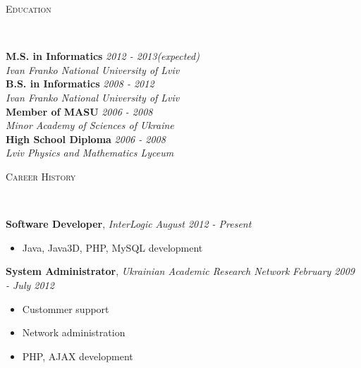 \documentclass{article}
\newenvironment{changemargin}[2]{%
  \begin{list}{}{%
    \setlength{\topsep}{0pt}%
    \setlength{\leftmargin}{#1}%
    \setlength{\rightmargin}{#2}%
    \setlength{\listparindent}{\parindent}%
    \setlength{\itemindent}{\parindent}%
    \setlength{\parsep}{\parskip}%
  }%
  \item[]}{\end{list}
}
\newcommand{\lineover}{
  \begin{changemargin}{-1mm}{-1mm}
    \vspace*{-8pt}
    \hrulefill \\
    \vspace*{-2pt}
  \end{changemargin}
}
\newcommand{\header}[1]{
  \begin{changemargin}{-12mm}{-12mm}
    \scshape{#1}\\
    \lineover
  \end{changemargin}
}
\newenvironment{body}{
  \vspace*{-16pt}
  \begin{changemargin}{-6mm}{-12mm}
}{
  \end{changemargin}
}
\begin{document}



\header{Education}

\begin{body}
  \vspace{14pt}
  \textbf{M.S. in Informatics} \hfill \emph{2012 - 2013(expected)} \\
  \emph{Ivan Franko National University of Lviv} \\
  \medskip
  \textbf{B.S. in Informatics} \hfill \emph{2008 - 2012} \\
  \emph{Ivan Franko National University of Lviv} \\
  \medskip
  \textbf{Member of MASU} \hfill \emph{2006 - 2008} \\
  \emph{Minor Academy of Sciences of Ukraine} \\
  \medskip
  \textbf{High School Diploma} \hfill \emph{2006 - 2008} \\
  \emph{Lviv Physics and Mathematics Lyceum} \\
\end{body}

\smallskip


\header{Career History}

\begin{body}
  \vspace{14pt}
  \textbf{Software Developer}, \emph{ InterLogic} \hfill \emph{August 2012 - Present}\\
  \vspace*{-4pt}
  \begin{itemize} \itemsep -0pt
    \item Java, Java3D, PHP, MySQL development
  \end{itemize}
  \textbf{System Administrator}, \emph{Ukrainian Academic Research Network} \hfill \emph{February 2009 - July 2012}\\
  \vspace*{-4pt}
  \begin{itemize} \itemsep -0pt
    \item Custommer support
    \item Network administration
    \item PHP, AJAX development
  \end{itemize}

\end{body}
\end{document}
